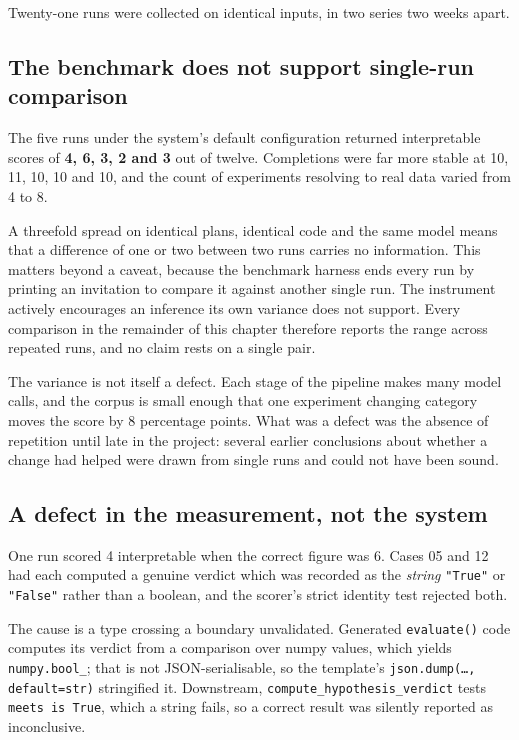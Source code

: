 Twenty-one runs were collected on identical inputs, in two series two weeks
apart.

\subsection{The benchmark does not support single-run comparison}
\label{sec:variance}

The five runs under the system's default configuration returned interpretable
scores of \textbf{4, 6, 3, 2 and 3} out of twelve. Completions were far more
stable at 10, 11, 10, 10 and 10, and the count of experiments resolving to real
data varied from 4 to 8.

A threefold spread on identical plans, identical code and the same model means
that a difference of one or two between two runs carries no information. This
matters beyond a caveat, because the benchmark harness ends every run by printing
an invitation to compare it against another single run. The instrument actively
encourages an inference its own variance does not support. Every comparison in
the remainder of this chapter therefore reports the range across repeated runs,
and no claim rests on a single pair.

The variance is not itself a defect. Each stage of the pipeline makes many model
calls, and the corpus is small enough that one experiment changing category moves
the score by 8 percentage points. What was a defect was the absence of repetition
until late in the project: several earlier conclusions about whether a change had
helped were drawn from single runs and could not have been sound.

\subsection{A defect in the measurement, not the system}

One run scored 4 interpretable when the correct figure was 6. Cases 05 and 12 had
each computed a genuine verdict which was recorded as the \emph{string}
\texttt{"True"} or \texttt{"False"} rather than a boolean, and the scorer's strict
identity test rejected both.

The cause is a type crossing a boundary unvalidated. Generated \texttt{evaluate()}
code computes its verdict from a comparison over numpy values, which yields
\texttt{numpy.bool\_}; that is not JSON-serialisable, so the template's
\texttt{json.dump(\ldots, default=str)} stringified it. Downstream,
\texttt{compute\_hypothesis\_verdict} tests \texttt{meets is True}, which a string
fails, so a correct result was silently reported as inconclusive.

